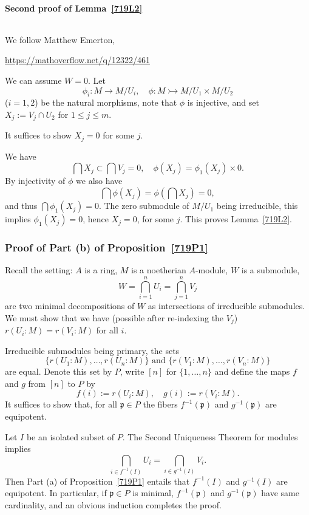\documentclass[parskip=half,fontsize=12pt]{scrartcl}%
\newcommand{\mf}{\mathfrak}
\newcommand{\ppp}{\mf p}
\newcommand{\mono}{\rightarrowtail}
\begin{document}
\paragraph{Second proof of Lemma~\ref{719L2}}${}$\medskip%

We follow Matthew Emerton, \medskip

\centerline{\href{https://mathoverflow.net/q/12322/461}{https://mathoverflow.net/q/12322/461}}

We can assume $W=0$. Let 
$$
\phi_i:M\to M/U_i,\quad\phi:M\mono M/U_1\times M/U_2
$$ 
($i=1,2$) be the natural morphisms, note that $\phi$ is injective, and set $X_j:=V_j\cap U_2$ for $1\le j\le m$. 

It suffices to show $X_j=0$ for some $j$.

We have 
$$
\bigcap X_j\subset \bigcap V_j=0,\quad\phi(X_j)=\phi_1(X_j)\times0.
$$ 
By injectivity of $\phi$ we also have 
$$
\bigcap\phi(X_j)=\phi\left(\bigcap X_j\right)=0,
$$ 
and thus $\bigcap\phi_1(X_j)=0$. The zero submodule of $M/U_1$ being ir\-re\-ducible, this implies $\phi_1(X_j)=0$, hence $X_j=0$, for some $j$. This proves Lemma~\ref{719L2}.

\subsubsection{Proof of Part (b) of Proposition~\ref{719P1}}%

Recall the setting: $A$ is a ring, $M$ is a noetherian $A$-module, $W$ is a submodule, 
$$
W=\bigcap_{i=1}^nU_i=\bigcap_{j=1}^nV_j
$$ 
are two minimal decompositions of $W$ as intersections of irreducible submodules. We must show that we have (possible after re-indexing the $V_j$) $r(U_i:M)=r(V_i:M)$ for all $i$.

Irreducible submodules being primary, the sets 
$$
\{r(U_1:M),\dots,r(U_n:M)\}\text{ and }\{r(V_1:M),\dots,r(V_n:M)\}
$$ 
are equal. Denote this set by $P$, write $[n]$ for $\{1,\dots,n\}$ and define the maps $f$ and $g$ from $[n]$ to $P$ by 
$$
f(i):=r(U_i:M),\quad g(i):=r(V_i:M).
$$ 
It suffices to show that, for all $\ppp\in P$ the fibers $f^{-1}(\ppp)$ and $g^{-1}(\ppp)$ are equipotent. 

Let $I$ be an isolated subset of $P$. The Second Uniqueness Theorem for modules implies 
$$
\bigcap_{i\in f^{-1}(I)}U_i=\bigcap_{i\in g^{-1}(I)}V_i.
$$ 
Then Part (a) of Proposition~\ref{719P1} entails that $f^{-1}(I)$ and $g^{-1}(I)$ are equipotent. In particular, if $\ppp\in P$ is minimal, $f^{-1}(\ppp)$ and $g^{-1}(\ppp)$ have same cardinality, and an obvious induction completes the proof. 
\end{document}
